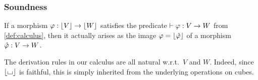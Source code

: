 \documentclass[a4paper]{memoir}
\begin{document}
\subsubsection{Soundness} \label{sec:jetcubes:calculus:soundness}
\begin{theorem}[Soundness] \label{thm:calculus-sound}
	If a morphism $\varphi : \mathopen{}\left\lfloor V \right\rfloor\mathclose{} \to \mathopen{}\left\lfloor W \right\rfloor\mathclose{}$ satisfies the predicate $\vdash \varphi : V \to W$ from \cref{def:calculus}, then it actually arises as the image $\varphi = \mathopen{}\left\lfloor \hat {\varphi} \right\rfloor\mathclose{}$ of a morphism $\hat {\varphi} : V \to W$.
\end{theorem}
\begin{remark} \label{rem:calculus-natural}
	The derivation rules in our calculus are all natural w.r.t.\ $V$ and $W$.
	Indeed, since $\mathopen{}\left\lfloor {\llcorner\hspace{-.4ex}\lrcorner} \right\rfloor\mathclose{}$ is faithful, this is simply inherited from the underlying operations on cubes.
\end{remark}
\end{document}
